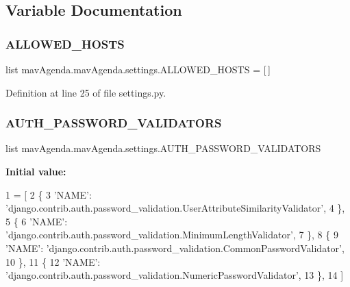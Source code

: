 \subsection{Variable Documentation}
\mbox{\label{namespacemavAgenda_1_1mavAgenda_1_1settings_ae6b895f9afe49d0e51d3f345ff7c5525}} 
\subsubsection{\texorpdfstring{A\+L\+L\+O\+W\+E\+D\+\_\+\+H\+O\+S\+TS}{ALLOWED\_HOSTS}}
{\footnotesize\ttfamily list mav\+Agenda.\+mav\+Agenda.\+settings.\+A\+L\+L\+O\+W\+E\+D\+\_\+\+H\+O\+S\+TS = \mbox{[}$\,$\mbox{]}}



Definition at line 25 of file settings.\+py.

\mbox{\label{namespacemavAgenda_1_1mavAgenda_1_1settings_a555250124fcbb58436b50248c49b55b6}} 
\subsubsection{\texorpdfstring{A\+U\+T\+H\+\_\+\+P\+A\+S\+S\+W\+O\+R\+D\+\_\+\+V\+A\+L\+I\+D\+A\+T\+O\+RS}{AUTH\_PASSWORD\_VALIDATORS}}
{\footnotesize\ttfamily list mav\+Agenda.\+mav\+Agenda.\+settings.\+A\+U\+T\+H\+\_\+\+P\+A\+S\+S\+W\+O\+R\+D\+\_\+\+V\+A\+L\+I\+D\+A\+T\+O\+RS}

{\bfseries Initial value\+:}
\begin{DoxyCode}
1 =  [
2     \{
3         \textcolor{stringliteral}{'NAME'}: \textcolor{stringliteral}{'django.contrib.auth.password\_validation.UserAttributeSimilarityValidator'},
4     \},
5     \{
6         \textcolor{stringliteral}{'NAME'}: \textcolor{stringliteral}{'django.contrib.auth.password\_validation.MinimumLengthValidator'},
7     \},
8     \{
9         \textcolor{stringliteral}{'NAME'}: \textcolor{stringliteral}{'django.contrib.auth.password\_validation.CommonPasswordValidator'},
10     \},
11     \{
12         \textcolor{stringliteral}{'NAME'}: \textcolor{stringliteral}{'django.contrib.auth.password\_validation.NumericPasswordValidator'},
13     \},
14 ]
\end{DoxyCode}


